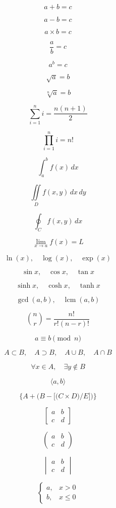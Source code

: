 \documentclass[preview, border=1pt, varwidth]{standalone}
\begin{document}
\[
a + b = c
\]

\[
a - b = c
\]

\[
a \times b = c
\]

\[
\frac{a}{b} = c
\]

\[
a^b = c
\]

\[
\sqrt{a} = b
\]

\[
\sqrt[n]{a} = b
\]

\[
\sum_{i=1}^{n} i = \frac{n(n+1)}{2}
\]

\[
\prod_{i=1}^{n} i = n!
\]

\[
\int_a^b f(x) \,dx
\]

\[
\iint\limits_D f(x,y) \,dx\,dy
\]

\[
\oint_C f(x,y) \,dx
\]

\[
\lim_{x \to a} f(x) = L
\]

\[
\ln(x), \quad \log(x), \quad \exp(x)
\]

\[
\sin x, \quad \cos x, \quad \tan x
\]

\[
\sinh x, \quad \cosh x, \quad \tanh x
\]

\[
\gcd(a, b), \quad \operatorname{lcm}(a, b)
\]

\[
\binom{n}{r} = \frac{n!}{r!(n-r)!}
\]

\[
a \equiv b \pmod{n}
\]

\[
A \subset B, \quad A \supset B, \quad A \cup B, \quad A \cap B
\]

\[
\forall x \in A, \quad \exists y \notin B
\]

\[
\langle a, b \rangle
\]

\[
\Bigg\{ A+ \bigg( B - \Big[ \big( C
\times D \big) / E \Big] \bigg) \Bigg\}
\]

\[
\begin{bmatrix} a & b \\ c & d \end{bmatrix}
\]

\[
\begin{pmatrix} a & b \\ c & d \end{pmatrix}
\]

\[
\begin{vmatrix} a & b \\ c & d \end{vmatrix}
\]

\[
\begin{cases} 
a, & x > 0 \\ 
b, & x \leq 0 
\end{cases}
\]
\end{document}
